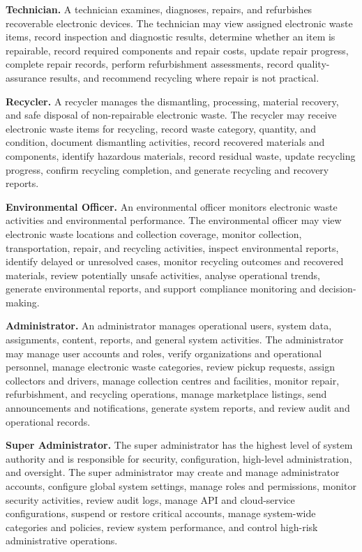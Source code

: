\textbf{Technician.} A technician examines, diagnoses, repairs, and refurbishes
recoverable electronic devices. The technician may view assigned electronic
waste items, record inspection and diagnostic results, determine whether an item
is repairable, record required components and repair costs, update repair
progress, complete repair records, perform refurbishment assessments, record
quality-assurance results, and recommend recycling where repair is not practical.

\textbf{Recycler.} A recycler manages the dismantling, processing, material
recovery, and safe disposal of non-repairable electronic waste. The recycler may
receive electronic waste items for recycling, record waste category, quantity, and
condition, document dismantling activities, record recovered materials and
components, identify hazardous materials, record residual waste, update
recycling progress, confirm recycling completion, and generate recycling and
recovery reports.

\textbf{Environmental Officer.} An environmental officer monitors electronic
waste activities and environmental performance. The environmental officer may
view electronic waste locations and collection coverage, monitor collection,
transportation, repair, and recycling activities, inspect environmental reports,
identify delayed or unresolved cases, monitor recycling outcomes and recovered
materials, review potentially unsafe activities, analyse operational trends,
generate environmental reports, and support compliance monitoring and
decision-making.

\textbf{Administrator.} An administrator manages operational users, system
data, assignments, content, reports, and general system activities. The
administrator may manage user accounts and roles, verify organizations and
operational personnel, manage electronic waste categories, review pickup
requests, assign collectors and drivers, manage collection centres and facilities,
monitor repair, refurbishment, and recycling operations, manage marketplace
listings, send announcements and notifications, generate system reports, and
review audit and operational records.

\textbf{Super Administrator.} The super administrator has the highest level of
system authority and is responsible for security, configuration, high-level
administration, and oversight. The super administrator may create and manage
administrator accounts, configure global system settings, manage roles and
permissions, monitor security activities, review audit logs, manage API and
cloud-service configurations, suspend or restore critical accounts, manage
system-wide categories and policies, review system performance, and control
high-risk administrative operations.

